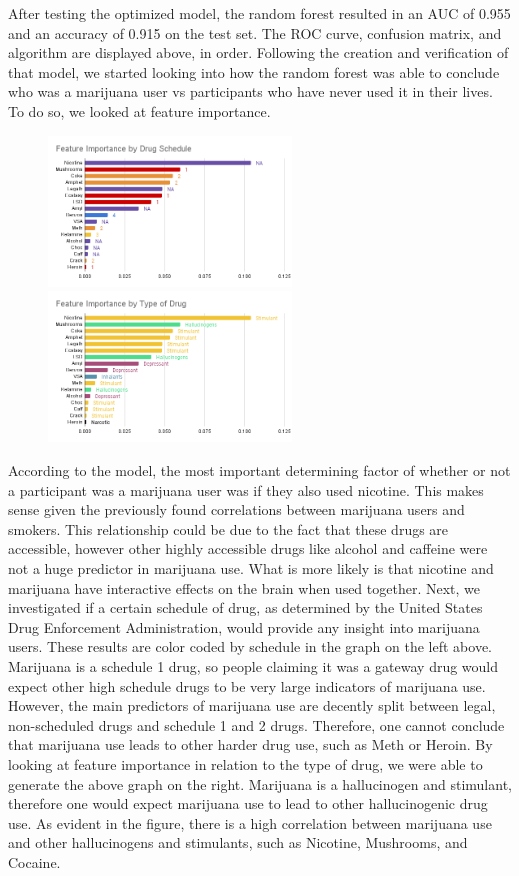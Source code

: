 \documentclass{article}
\begin{document}
\noindent After testing the optimized model, the random forest resulted in an AUC of 0.955 and an accuracy of 0.915 on the test set. The ROC curve, confusion matrix, and algorithm are displayed above, in order. Following the creation and verification of that model, we started looking into how the random forest was able to conclude who was a marijuana user vs participants who have never used it in their lives. To do so, we looked at feature importance.

\begin{figure}[htp]
\centering
\includegraphics[height=4cm]{Feature Importance by Drug Schedule.png}\hfill
\includegraphics[height=4cm]{Feature Importance by Type of Drug.png}
\end{figure}

According to the model, the most important determining factor of whether or not a participant was a marijuana user was if they also used nicotine. This makes sense given the previously found correlations between marijuana users and smokers. This relationship could be due to the fact that these drugs are accessible, however other highly accessible drugs like alcohol and caffeine were not a huge predictor in marijuana use. What is more likely is that nicotine and marijuana have interactive effects on the brain when used together. 
Next, we investigated if a certain schedule of drug, as determined by the United States Drug Enforcement Administration, would provide any insight into marijuana users. These results are color coded by schedule in the graph on the left above. Marijuana is a schedule 1 drug, so people claiming it was a gateway drug would expect other high schedule drugs to be very large indicators of marijuana use. However, the main predictors of marijuana use are decently split between legal, non-scheduled drugs and schedule 1 and 2 drugs. Therefore, one cannot conclude that marijuana use leads to other harder drug use, such as Meth or Heroin.
By looking at feature importance in relation to the type of drug, we were able to generate the above graph on the right. Marijuana is a hallucinogen and stimulant, therefore one would expect marijuana use to lead to other hallucinogenic drug use. As evident in the figure, there is a high correlation between marijuana use and other hallucinogens and stimulants, such as Nicotine, Mushrooms, and Cocaine.
	
\end{document}
